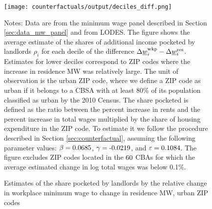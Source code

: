 \begin{figure}[h!]
    \centering
    \caption{Estimates of the share pocketed by landlords by the relative 
             change in workplace minimum wage to change in residence MW, urban ZIP codes}
    \label{fig:rho_by_decile_MW_gap}

	\texttt{[image: counterfactuals/output/deciles\_diff.png]}

    \begin{minipage}{.95\textwidth} \footnotesize
        \vspace{3mm}
        Notes:
        Data are from the minimum wage panel described in 
        Section \ref{sec:data_mw_panel} and from LODES.
        The figure shows the average estimate of the shares of additional
        income pocketed by landlords $\rho_i$ for each decile of the 
        difference $\Delta \underline{w}_i^{\text{wkp}} - \Delta \underline{w}_i^{\text{res}}$.
        Estimates for lower deciles correspond to ZIP codes where the increase 
        in residence MW was relatively large.
        The unit of observation is the urban ZIP code, where we define a ZIP code 
        as urban if it belongs to a CBSA with at least 80\% of its population 
        classified as urban by the 2010 Census.
        The share pocketed is defined as the ratio between the percent increase 
        in rents and the percent increase in total wages multiplied by the share 
        of housing expenditure in the ZIP code.
        To estimate it we follow the procedure described in Section 
        \ref{sec:counterfactual}, assuming the following parameter values: 
        $\beta = \textnormal{0.0685}$, $\gamma = \textnormal{-0.0219}$, and $\varepsilon = \textnormal{0.1084}$.
        The figure excludes ZIP codes located in the $\textnormal{60}$ CBAs for which the average
        estimated change in log total wages was below 0.1\%.
    \end{minipage}
\end{figure}
